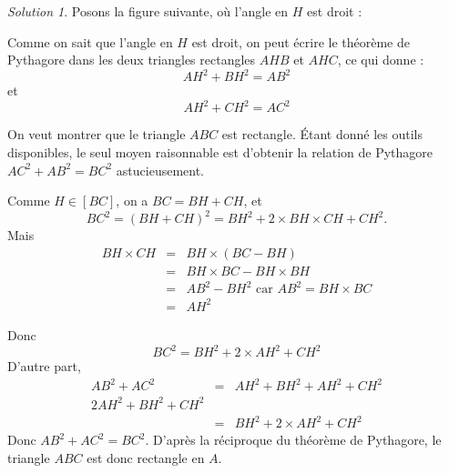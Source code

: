 \documentclass[14pt]{article}
\theoremstyle{remark}
\newtheorem*{sol}{Solution}
\newcounter{n}
\theoremstyle{plain}
\begin{document}
\begin{sol}

Posons la figure suivante, où l'angle en $H$ est droit : 
\begin{figure}[H]
\center
{}
\end{figure}
Comme on sait que l'angle en $H$ est droit, on peut écrire le théorème de Pythagore dans les deux triangles rectangles $AHB$ et $AHC$, ce qui donne : 
\[ AH^2+BH^2 = AB^2 \]
et \[AH^2+CH^2=AC^2\]

On veut montrer que le triangle $ABC$ est rectangle. Étant donné les outils disponibles, le seul moyen raisonnable est d'obtenir la relation de Pythagore $AC^2+AB^2 = BC^2$ astucieusement. 

Comme $H\in[BC]$, on a $BC= BH+CH$, et \[BC^2 = (BH+CH)^2 = BH^2+2\times BH\times CH + CH^2.\]
Mais \begin{eqnarray*} BH\times CH &=& BH \times (BC-BH)\\
&=& BH\times BC - BH\times BH\\
&=& AB^2 - BH^2 \text{         car $AB^2=BH\times BC$} \\
&=& AH^2\end{eqnarray*}

Donc \[BC^2 = BH^2 + 2\times AH^2 + CH^2\]
D'autre part, \begin{eqnarray*} AB^2+AC^2 &=& AH^2+BH^2 + AH^2+CH^2\\
2AH^2+BH^2+CH^2 \\
&=& BH^2 + 2\times AH^2 + CH^2
\end{eqnarray*}
Donc $AB^2+AC^2 = BC^2$. D'après la réciproque du théorème de Pythagore, le triangle $ABC$ est donc rectangle en $A$. 
\end{sol}
\end{document}
